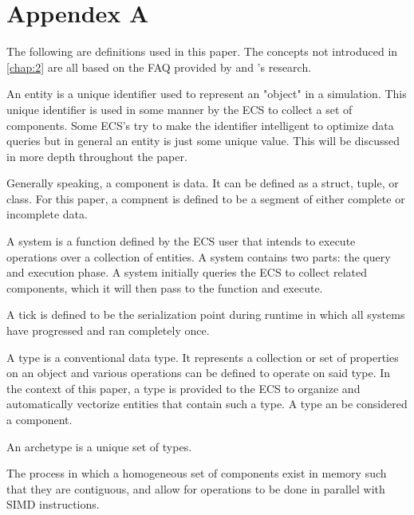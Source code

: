 \appendix
\section{Appendex A}
\label{appendix:a}

The following are definitions used in this paper. The concepts not introduced in \ref{chap:2} are all based on the FAQ provided by \cite{SanderMertensFAQ} and \cite{RomeoPHD}'s research.
\begin{description}[font=\sffamily\bfseries, leftmargin=1cm, style=nextline]
    \item[Entity]
        An entity is a unique identifier used to represent an "object" in a simulation. This unique identifier is used in some manner by the ECS to collect a set of components. Some ECS's try to make the identifier intelligent to optimize data queries but in general an entity is just some unique value. This will be discussed in more depth throughout the paper.
    \item[Component]
        Generally speaking, a component is data. It can be defined as a struct, tuple, or class. For this paper, a compnent is defined to be a segment of either complete or incomplete data.
    \item[System]
        A system is a function defined by the ECS user that intends to execute operations over a collection of entities. A system contains two parts: the query and execution phase. A system initially queries the ECS to collect related components, which it will then pass to the function and execute.
    \item[Tick]
        A tick is defined to be the serialization point during runtime in which all systems have progressed and ran completely once.
    \item[Type]
        A type is a conventional data type. It represents a collection or set of properties on an object and various operations can be defined to operate on said type. In the context of this paper, a type is provided to the ECS to organize and automatically vectorize entities that contain such a type. A type an be considered a component.
    \item[Archetype] 
        An archetype is a unique set of types.
    \item[Vectorization]
        The process in which a homogeneous set of components exist in memory such that they are contiguous, and allow for operations to be done in parallel with SIMD instructions.
  \end{description}


